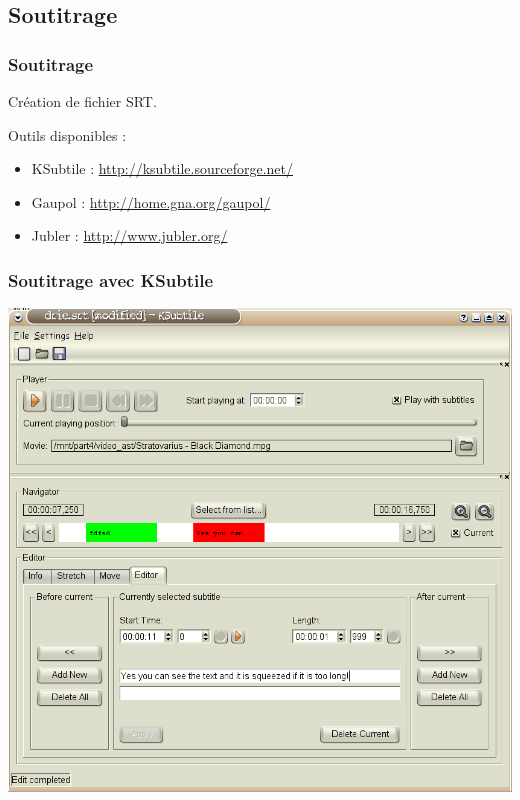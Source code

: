 \subsection{Soutitrage}
\begin{frame}
 \frametitle{Soutitrage}
 Création de fichier SRT.
 
 Outils disponibles :
 \begin{itemize}
\item KSubtile : \href{http://ksubtile.sourceforge.net/}{http://ksubtile.sourceforge.net/}
\item Gaupol : \href{http://home.gna.org/gaupol/}{http://home.gna.org/gaupol/}
\item Jubler : \href{http://www.jubler.org/}{http://www.jubler.org/}
\end{itemize}
\end{frame}

\begin{frame}
 \frametitle{Soutitrage avec KSubtile}
 \includegraphics[scale=0.25]{ressources/ksubtile.png}
 \end{frame}
 
